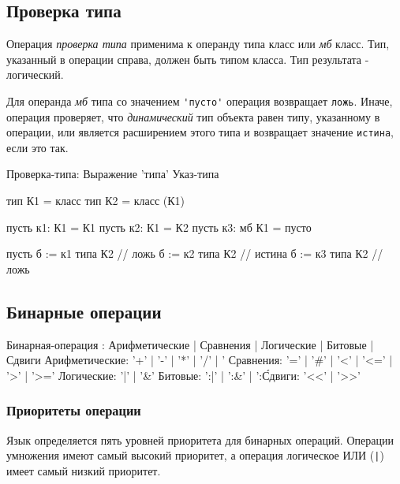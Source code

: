 \hypertarget{of-type}{%
\subsection{Проверка типа}\label{expr:of-type}}

Операция \emph{проверка типа} применима к операнду типа класс или \emph{мб} класс. Тип, указанный в операции справа, должен быть типом класса.
Тип результата - логический.

Для операнда \emph{мб} типа со значением \verb+'пусто'+ операция возвращает  \verb+ложь+. 
Иначе, операция проверяет, что \emph{динамический} тип объекта равен типу, 
указанному в операции, или является расширением этого типа и возвращает значение \verb+истина+, если это так.

\begin{Grammar}
Проверка-типа: Выражение 'типа' Указ-типа 
\end{Grammar}    

\begin{Trivil}
тип К1 = класс {}
тип К2 = класс (К1) {}

пусть к1: К1 = К1{}
пусть к2: К1 = К2{}
пусть к3: мб К1 = пусто

пусть б :=  к1 типа К2 // ложь
б := к2 типа К2 // истина
б := к3 типа К2 // ложь
\end{Trivil}


\hypertarget{binary-ops}{%
\subsection{Бинарные операции}\label{expr:binary-ops}}

\begin{Grammar}
Бинарная-операция
    : Арифметические
    | Сравнения
    | Логические
    | Битовые
    | Сдвиги
Арифметические: '+' | '-' | '*' | '/' | '%
Сравнения: '=' | '#' | '<' | '<=' | '>' | '>='
Логические: '|' | '&' 
Битовые: ':|' | ':&' | ':\'
Сдвиги:   '<<' | '>>'
\end{Grammar} 


\hypertarget{ops-precedence}{%
\subsubsection{Приоритеты операции}\label{expr:ops-precedence}}

Язык определяется пять уровней приоритета для бинарных операций. Операции умножения имеют самый высокий приоритет, а операция логическое ИЛИ (\verb+|+) имеет самый низкий приоритет.

